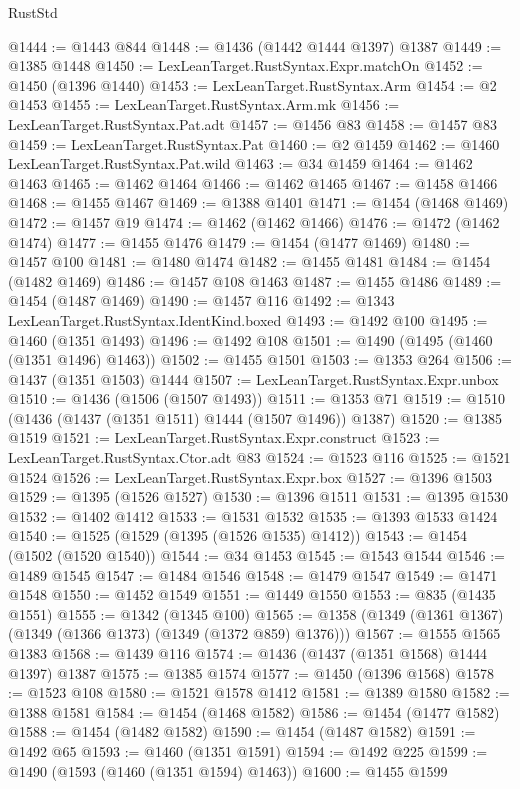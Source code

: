 \begin{lexlean}{RustStd}
\begin{coremodule}
{\begin{coremodule}
{{{{{{{{{{@1444 := @1443 @844
@1448 := @1436 (@1442 @1444 @1397) @1387
@1449 := @1385 @1448
@1450 := LexLeanTarget.RustSyntax.Expr.matchOn
@1452 := @1450 (@1396 @1440)
@1453 := LexLeanTarget.RustSyntax.Arm
@1454 := @2 @1453
@1455 := LexLeanTarget.RustSyntax.Arm.mk
@1456 := LexLeanTarget.RustSyntax.Pat.adt
@1457 := @1456 @83
@1458 := @1457 @83
@1459 := LexLeanTarget.RustSyntax.Pat
@1460 := @2 @1459
@1462 := @1460 LexLeanTarget.RustSyntax.Pat.wild
@1463 := @34 @1459
@1464 := @1462 @1463
@1465 := @1462 @1464
@1466 := @1462 @1465
@1467 := @1458 @1466
@1468 := @1455 @1467
@1469 := @1388 @1401
@1471 := @1454 (@1468 @1469)
@1472 := @1457 @19
@1474 := @1462 (@1462 @1466)
@1476 := @1472 (@1462 @1474)
@1477 := @1455 @1476
@1479 := @1454 (@1477 @1469)
@1480 := @1457 @100
@1481 := @1480 @1474
@1482 := @1455 @1481
@1484 := @1454 (@1482 @1469)
@1486 := @1457 @108 @1463
@1487 := @1455 @1486
@1489 := @1454 (@1487 @1469)
@1490 := @1457 @116
@1492 := @1343 LexLeanTarget.RustSyntax.IdentKind.boxed
@1493 := @1492 @100
@1495 := @1460 (@1351 @1493)
@1496 := @1492 @108
@1501 := @1490 (@1495 (@1460 (@1351 @1496) @1463))
@1502 := @1455 @1501
@1503 := @1353 @264
@1506 := @1437 (@1351 @1503) @1444
@1507 := LexLeanTarget.RustSyntax.Expr.unbox
@1510 := @1436 (@1506 (@1507 @1493))
@1511 := @1353 @71
@1519 := @1510 (@1436 (@1437 (@1351 @1511) @1444 (@1507 @1496)) @1387)
@1520 := @1385 @1519
@1521 := LexLeanTarget.RustSyntax.Expr.construct
@1523 := LexLeanTarget.RustSyntax.Ctor.adt @83
@1524 := @1523 @116
@1525 := @1521 @1524
@1526 := LexLeanTarget.RustSyntax.Expr.box
@1527 := @1396 @1503
@1529 := @1395 (@1526 @1527)
@1530 := @1396 @1511
@1531 := @1395 @1530
@1532 := @1402 @1412
@1533 := @1531 @1532
@1535 := @1393 @1533 @1424
@1540 := @1525 (@1529 (@1395 (@1526 @1535) @1412))
@1543 := @1454 (@1502 (@1520 @1540))
@1544 := @34 @1453
@1545 := @1543 @1544
@1546 := @1489 @1545
@1547 := @1484 @1546
@1548 := @1479 @1547
@1549 := @1471 @1548
@1550 := @1452 @1549
@1551 := @1449 @1550
@1553 := @835 (@1435 @1551)
@1555 := @1342 (@1345 @100)
@1565 := @1358 (@1349 (@1361 @1367) (@1349 (@1366 @1373) (@1349 (@1372 @859) @1376)))
@1567 := @1555 @1565 @1383
@1568 := @1439 @116
@1574 := @1436 (@1437 (@1351 @1568) @1444 @1397) @1387
@1575 := @1385 @1574
@1577 := @1450 (@1396 @1568)
@1578 := @1523 @108
@1580 := @1521 @1578 @1412
@1581 := @1389 @1580
@1582 := @1388 @1581
@1584 := @1454 (@1468 @1582)
@1586 := @1454 (@1477 @1582)
@1588 := @1454 (@1482 @1582)
@1590 := @1454 (@1487 @1582)
@1591 := @1492 @65
@1593 := @1460 (@1351 @1591)
@1594 := @1492 @225
@1599 := @1490 (@1593 (@1460 (@1351 @1594) @1463))
@1600 := @1455 @1599
}}}}}}}}}}
\end{coremodule}}
\end{coremodule}
\end{lexlean}
